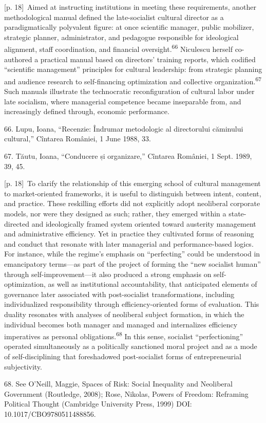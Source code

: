 \documentclass[10pt,a4paper]{article}
\begin{document}
{\scriptsize\color{gray} [p. 18]}\ Aimed at instructing institutions in meeting these requirements, another methodological manual defined the late-socialist cultural director as a paradigmatically polyvalent figure: at once scientific manager, public mobilizer, strategic planner, administrator, and pedagogue responsible for ideological alignment, staff coordination, and financial oversight.\nobreak\textsuperscript{66} Niculescu herself co-authored a practical manual based on directors’ training reports, which codified “scientific management” principles for cultural leadership: from strategic planning and audience research to self-financing optimization and collective organization.\nobreak\textsuperscript{67} Such manuals illustrate the technocratic reconfiguration of cultural labor under late socialism, where managerial competence became inseparable from, and increasingly defined through, economic performance.\par{\small 66. Lupu, Ioana, “Recenzie: Îndrumar metodologic al directorului căminului cultural,” Cîntarea României, 1 June 1988, 33.\par}{\small 67. Tăutu, Ioana, “Conducere și organizare,” Cîntarea României, 1 Sept. 1989, 39, 45.\par}
{\scriptsize\color{gray} [p. 18]}\ To clarify the relationship of this emerging school of cultural management to market-oriented frameworks, it is useful to distinguish between intent, content, and practice. These reskilling efforts did not explicitly adopt neoliberal corporate models, nor were they designed as such; rather, they emerged within a state-directed and ideologically framed system oriented toward austerity management and administrative efficiency. Yet in practice they cultivated forms of reasoning and conduct that resonate with later managerial and performance-based logics. For instance, while the regime’s emphasis on “perfecting” could be understood in emancipatory terms—as part of the project of forming the “new socialist human” through self-improvement—it also produced a strong emphasis on self-optimization, as well as institutional accountability, that anticipated elements of governance later associated with post-socialist transformations, including individualized responsibility through efficiency-oriented forms of evaluation. This duality resonates with analyses of neoliberal subject formation, in which the individual becomes both manager and managed and internalizes efficiency imperatives as personal obligations.\nobreak\textsuperscript{68} In this sense, socialist “perfectioning” operated simultaneously as a politically sanctioned moral project and as a mode of self-disciplining that foreshadowed post-socialist forms of entrepreneurial subjectivity.\par{\small 68. See O’Neill, Maggie, Spaces of Risk: Social Inequality and Neoliberal Government (Routledge, 2008); Rose, Nikolas, Powers of Freedom: Reframing Political Thought (Cambridge University Press, 1999) DOI: 10.1017/CBO9780511488856.\par}
\end{document}
